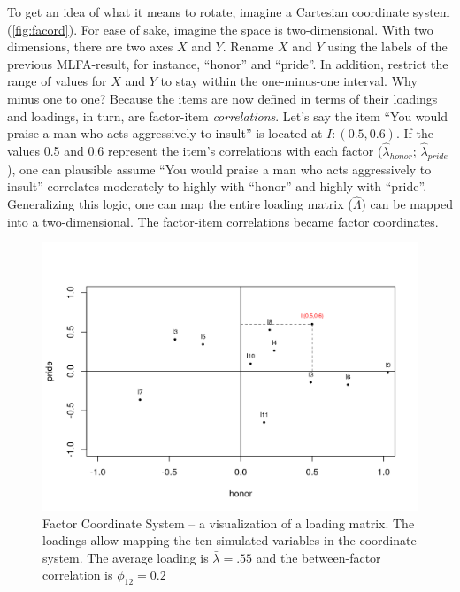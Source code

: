\documentclass[jou, 11pt]{apa7}
\begin{document}
To get an idea of what it means to rotate, imagine a Cartesian coordinate
system (\autoref{fig:facord}). For ease of sake, imagine the space is
two-dimensional. With two dimensions, there are two axes $X$ and $Y$. Rename
$X$ and $Y$ using the labels of the previous MLFA-result, for instance,
\enquote{honor} and \enquote{pride}. In addition, restrict the range of values
for $X$ and $Y$ to stay within the one-minus-one interval. Why minus one to
one? Because the items are now defined in terms of their loadings and loadings,
in turn, are factor-item \textit{correlations}. Let’s say the item \enquote{You
would praise a man who acts aggressively to insult} is located at $I:
(0.5,0.6)$. If the values 0.5 and 0.6 represent the item’s correlations with
each factor ($\hat{\lambda}_{honor}$; $\hat{\lambda}_{pride}$), one can
plausible assume \enquote{You would praise a man who acts aggressively to
insult} correlates moderately to highly with \enquote{honor} and highly with
\enquote{pride}. Generalizing this logic, one can map the entire loading matrix
($\hat{\Lambda}$) can be mapped into a two-dimensional. The factor-item
correlations became factor coordinates.

\begin{figure}[htb]
\center
\includegraphics[scale=0.80]{figures/facord-1.png}
\caption[Factor Coordinate System]{
Factor Coordinate System -- a visualization of a loading matrix. The loadings
allow mapping the ten simulated variables in the coordinate system. The average
loading is $\bar\lambda=.55$ and the between-factor correlation is
$\phi_{12}=0.2$}
\label{fig:facord}
\end{figure}
\end{document}
